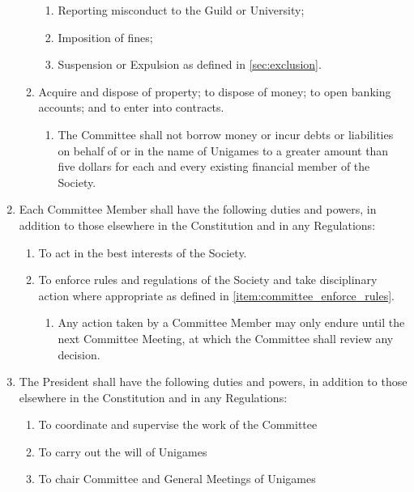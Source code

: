 \documentclass[a4paper]{article}
\begin{document}
\begin{enumerate}
\begin{enumerate}
\begin{enumerate}
                        \item Reporting misconduct to the Guild or University;
                        \item Imposition of fines;
                        \item Suspension or Expulsion as defined in \cref{sec:exclusion}.
                    \end{enumerate}
              \item Acquire and dispose of property; to dispose of money; to open banking accounts; and to enter into contracts.
                    \begin{enumerate}
                        \item The Committee shall not borrow money or incur debts or liabilities on behalf of or in the name of Unigames to a greater amount than five dollars for each and every existing financial member of the Society.
                    \end{enumerate}
          \end{enumerate}
    \item Each Committee Member shall have the following duties and powers, in addition to those elsewhere in the Constitution and in any Regulations:
          \begin{enumerate}
              \item To act in the best interests of the Society.
              \item To enforce rules and regulations of the Society and take disciplinary action where appropriate as defined in \cref{item:committee_enforce_rules}.
                    \begin{enumerate}
                        \item Any action taken by a Committee Member may only endure until the next Committee Meeting, at which the Committee shall review any decision.
                    \end{enumerate}
          \end{enumerate}
    \item The President shall have the following duties and powers, in addition to those elsewhere in the Constitution and in any Regulations: \label{item:pres_duties}
          \begin{enumerate}
              \item To coordinate and supervise the work of the Committee
              \item To carry out the will of Unigames
              \item To chair Committee and General Meetings of Unigames

\end{enumerate}
\end{enumerate}
\end{document}

